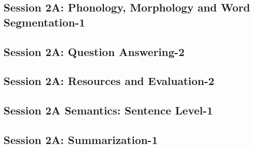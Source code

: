 \subsection{\large Session 2A: Phonology, Morphology and Word Segmentation-1}
\label{parallel-session-2A-trackE}
\TrackELoc\hfill\sessionchair{}{}
\clearpage
\subsection{\large Session 2A: Question Answering-2}
\label{parallel-session-2A-trackF}
\TrackFLoc\hfill\sessionchair{}{}
\clearpage
\subsection{\large Session 2A: Resources and Evaluation-2}
\label{parallel-session-2A-trackG}
\TrackGLoc\hfill\sessionchair{}{}
\clearpage
\subsection{\large Session 2A Semantics: Sentence Level-1}
\label{parallel-session-2A-trackH}
\TrackHLoc\hfill\sessionchair{}{}
\clearpage
\subsection{\large Session 2A: Summarization-1}
\label{parallel-session-2A-trackI}
\TrackILoc\hfill\sessionchair{}{}
\clearpage


